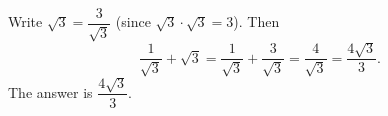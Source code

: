 Write $\sqrt3=\dfrac{3}{\sqrt3}$ (since $\sqrt3\cdot\sqrt3=3$). Then
\[\dfrac{1}{\sqrt3}+\sqrt3=\dfrac{1}{\sqrt3}+\dfrac{3}{\sqrt3}=\dfrac{4}{\sqrt3}=\dfrac{4\sqrt3}{3}.\]
The answer is $\boxed{\dfrac{4\sqrt3}{3}}$.
